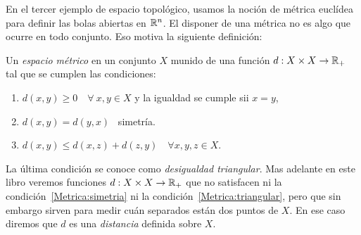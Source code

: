 {}
\label{s:WL:Metrico}

En el  tercer ejemplo de espacio  topol\'ogico, usamos la  noci\'on de m\'etrica
eucl\'idea  para definir las  bolas abiertas  en $\mathbb{R}^n$.  El disponer  de una
m\'etrica  no es  algo que  ocurre  en todo  conjunto. Eso  motiva la  siguiente
definici\'on:
%
\begin{definicion}
  Un {\it  espacio m\'etrico} en un conjunto  $X$ munido de una  funci\'on $d: X
  \times X \rightarrow \mathbb{R}_+$ tal que se cumplen las condiciones:
%
\begin{enumerate}
\item $d(x,y) \ge 0 \quad \forall \: x , y \in X$ y la igualdad se cumple sii $x
  = y$,
%
\item\label{Metrica:simetria} $d(x,y) = d(y,x)$ \ simetr\'ia.
%
\item\label{Metrica:triangular} $d(x,y) \le d(x,z) +  d(z,y) \quad \forall x , y
  , z \in X$.
\end{enumerate}
\end{definicion}
%
\noindent   La   \'ultima   condici\'on   se  conoce   como   {\it   desigualdad
  triangular}.  Mas adelante  en este  libro veremos  funciones $d:  X  \times X
\rightarrow \mathbb{R}_+$ que  no satisfacen ni la condici\'on~\ref{Metrica:simetria}
ni  la condici\'on~\ref{Metrica:triangular},  pero que  sin embargo  sirven para
medir cu\'an separados est\'an dos puntos de $X$. En ese caso diremos que $d$ es
una {\it distancia} definida sobre $X$.%
